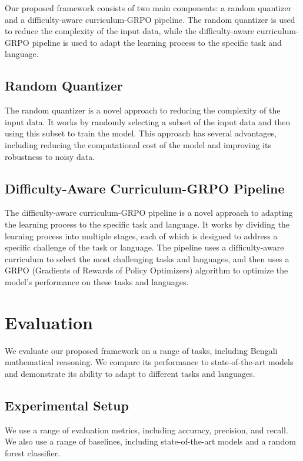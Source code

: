 \documentclass{article}
\begin{document}
Our proposed framework consists of two main components: a random quantizer and a difficulty-aware curriculum-GRPO pipeline. The random quantizer is used to reduce the complexity of the input data, while the difficulty-aware curriculum-GRPO pipeline is used to adapt the learning process to the specific task and language.

\subsection{Random Quantizer}

The random quantizer is a novel approach to reducing the complexity of the input data. It works by randomly selecting a subset of the input data and then using this subset to train the model. This approach has several advantages, including reducing the computational cost of the model and improving its robustness to noisy data.

\subsection{Difficulty-Aware Curriculum-GRPO Pipeline}

The difficulty-aware curriculum-GRPO pipeline is a novel approach to adapting the learning process to the specific task and language. It works by dividing the learning process into multiple stages, each of which is designed to address a specific challenge of the task or language. The pipeline uses a difficulty-aware curriculum to select the most challenging tasks and languages, and then uses a GRPO (Gradients of Rewards of Policy Optimizers) algorithm to optimize the model's performance on these tasks and languages.

\section{Evaluation}

We evaluate our proposed framework on a range of tasks, including Bengali mathematical reasoning. We compare its performance to state-of-the-art models and demonstrate its ability to adapt to different tasks and languages.

\subsection{Experimental Setup}

We use a range of evaluation metrics, including accuracy, precision, and recall. We also use a range of baselines, including state-of-the-art models and a random forest classifier.
\end{document}
